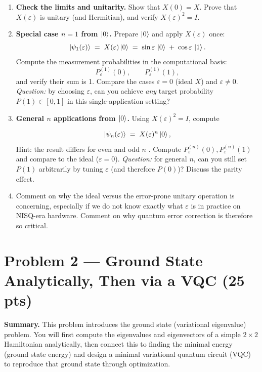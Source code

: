 \documentclass[11pt]{article}
\newenvironment{summary}{\par\noindent\textbf{Summary.} }{\par}
\begin{document}
\begin{enumerate}[label=(\alph*)]
\item \textbf{Check the limits and unitarity.}
Show that $X(0)=X$. Prove that $X(\varepsilon)$ is unitary (and Hermitian), and verify $X(\varepsilon)^2=I$.

\item \textbf{Special case $n=1$ from $\ket{0}$.}
Prepare $\ket{0}$ and apply $X(\varepsilon)$ once:
\[
\ket{\psi_1(\varepsilon)} \;=\; X(\varepsilon)\ket{0}
\;=\; \sin\varepsilon\,\ket{0} \;+\; \cos\varepsilon\,\ket{1}.
\]
Compute the measurement probabilities in the computational basis:
\[
P_{\varepsilon}^{(1)}(0),\qquad
P_{\varepsilon}^{(1)}(1),
\] and verify their sum is 1.
Compare the cases $\varepsilon=0$ (ideal $X$) and $\varepsilon\neq 0$. \emph{Question:} by choosing $\varepsilon$, can you achieve \emph{any} target probability $P(1)\in[0,1]$ in this single-application setting?

\item \textbf{General $n$ applications from $\ket{0}$.}
Using $X(\varepsilon)^2=I$, compute

\[
\ket{\psi_n(\varepsilon)} \;=\; X(\varepsilon)^n  \ket{0},
\] Hint: the result differs for even and odd $n$ \smiley{}.
Compute $P_{\varepsilon}^{(n)}(0),P_{\varepsilon}^{(n)}(1)$ and compare to the ideal ($\varepsilon=0$). \emph{Question:} for general $n$, can you still set $P(1)$ arbitrarily by tuning $\varepsilon$ (and therefore $P(0)$)? Discuss the parity effect.

\item Comment on why the ideal versus the error-prone unitary operation is concerning, especially if we do not know exactly what $\varepsilon$ is in practice on NISQ-era hardware. Comment on why quantum error correction is therefore so critical.  
\end{enumerate}

\section*{Problem 2 — Ground State Analytically, Then via a VQC (25 pts)}

\begin{summary}
This problem introduces the ground state (variational eigenvalue) problem. You will first compute the eigenvalues and eigenvectors of a simple $2\times2$ Hamiltonian analytically, then connect this to finding the minimal energy (ground state energy) and design a minimal variational quantum circuit (VQC) to reproduce that ground state through optimization.
\end{summary}
\end{document}
